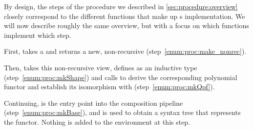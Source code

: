 
By design, the steps of the procedure we described in \cref{sec:procedure:overview} closely correspond to the different functions that make up s implementation. We will now describe roughly the same overview, but with a focus
on which functions implement which step.

First,  takes a  and returns a new, non-recursive  (step~\ref{enum:proc:make_nonrec}).  

Then,  takes this non-recursive view, defines  as an inductive type (step~\ref{enum:proc:mkShape}) and calls  to derive the corresponding polynomial functor and establish its isomorphism with  (step~\ref{enum:proc:mkQpf}).

Continuing,  is the entry point into the composition pipeline (step~\ref{enum:proc:mkBase}), and is used to obtain a syntax tree that represents the  functor.
Nothing is added to the environment at this step.

